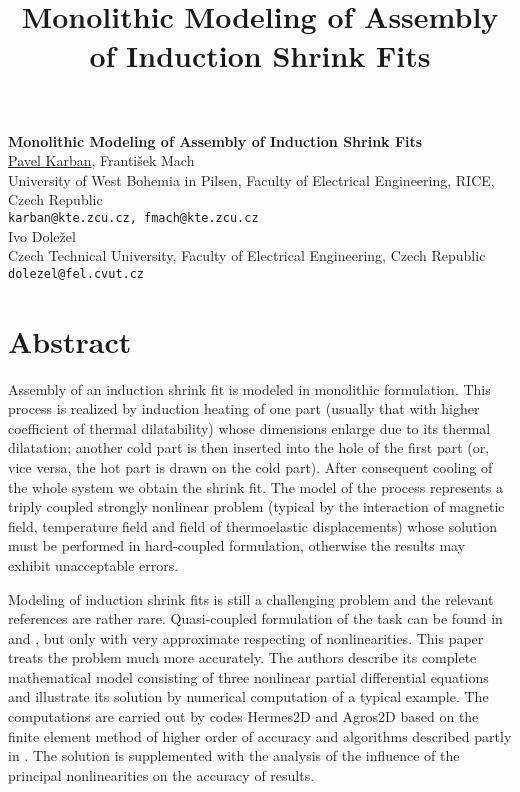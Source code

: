 \title{Monolithic Modeling of Assembly of Induction Shrink Fits}
\author{} \institute{}
\tocauthor{}

\begin{center}

\textbf{\Large Monolithic Modeling of Assembly of Induction Shrink Fits}\\
\vspace{10mm}
{\large \underline{Pavel Karban}, Franti\v{s}ek Mach}\\
University of West Bohemia in Pilsen, Faculty of Electrical Engineering, RICE,
Czech Republic\\
{\tt karban@kte.zcu.cz, fmach@kte.zcu.cz}\\
\vspace{4mm}
{\large Ivo Dole\v{z}el}\\
Czech Technical University, Faculty of Electrical Engineering, 
Czech Republic\\
{\tt dolezel@fel.cvut.cz}

\end{center}

\section*{Abstract}

Assembly of an induction shrink fit is modeled in monolithic formulation. This process is realized by induction heating of one part (usually that with higher coefficient of thermal dilatability) whose dimensions enlarge due to its thermal dilatation; another cold part is then inserted into the hole of the first part (or, vice versa, the hot part is drawn on the cold part). After consequent cooling of the whole system we obtain the shrink fit. The model of the process represents a triply coupled strongly nonlinear problem (typical by the interaction of magnetic field, temperature field and field of thermoelastic displacements) whose solution must be performed in hard-coupled formulation, otherwise the results may exhibit unacceptable errors.

Modeling of induction shrink fits is still a challenging problem and the relevant references are rather rare. Quasi-coupled formulation of the task can be found in \cite{Skopek} and \cite{Ukraine}, but only with very approximate respecting of nonlinearities. This paper treats the problem much more accurately. The authors describe its complete mathematical model consisting of three nonlinear partial differential equations and illustrate its solution by numerical computation of a typical example. The computations are carried out by codes Hermes2D and Agros2D \cite{Hermes2D} based on the finite element method of higher order of accuracy and algorithms described partly in \cite{Solin}. The solution is supplemented with the analysis of the influence of the principal nonlinearities on the accuracy of results.

